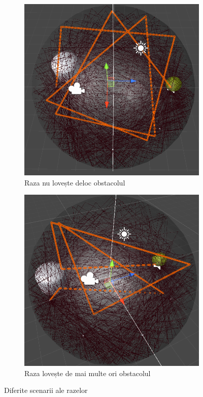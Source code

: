\begin{figure}[!htb]
\begin{subfigure}[b]{.3\textwidth}
			\includegraphics[width=1\linewidth]{imagini/m6r135-5000.png}
			\caption{Raza nu lovește deloc obstacolul}
		\end{subfigure}
		\hfill
		\begin{subfigure}[b]{.3\textwidth}
			\centering
			\includegraphics[width=1\linewidth]{imagini/m6r124-5000.png}
			\caption{Raza lovește de mai multe ori obstacolul}
			\label{fig:sub-third2}
		\end{subfigure}
		
		\caption{Diferite scenarii ale razelor}
		\label{fig:Fig22}
		
	\end{figure}

